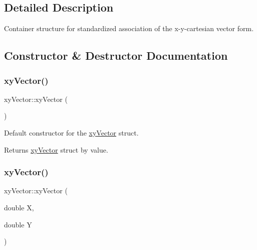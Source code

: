 \subsection{Detailed Description}
Container structure for standardized association of the x-\/y-\/cartesian vector form. 

\subsection{Constructor \& Destructor Documentation}
\mbox{\label{structxy_vector_a0ee1f276edc4c2aaf1c5973cfe150904}} 
\subsubsection{\texorpdfstring{xy\+Vector()}{xyVector()}\hspace{0.1cm}{\footnotesize\ttfamily [1/2]}}
{\footnotesize\ttfamily xy\+Vector\+::xy\+Vector (\begin{DoxyParamCaption}{ }\end{DoxyParamCaption})\hspace{0.3cm}{\ttfamily [inline]}}



Default constructor for the \hyperlink{structxy_vector}{xy\+Vector} struct. 

\begin{DoxyReturn}{Returns}
\hyperlink{structxy_vector}{xy\+Vector} struct by value. 
\end{DoxyReturn}
\mbox{\label{structxy_vector_a06d9403f8df005a7ea3b7765973a93fe}} 
\subsubsection{\texorpdfstring{xy\+Vector()}{xyVector()}\hspace{0.1cm}{\footnotesize\ttfamily [2/2]}}
{\footnotesize\ttfamily xy\+Vector\+::xy\+Vector (\begin{DoxyParamCaption}\item[{double}]{X,  }\item[{double}]{Y }\end{DoxyParamCaption})\hspace{0.3cm}{\ttfamily [inline]}}



